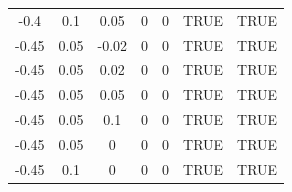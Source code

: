 \documentclass[
10pt, %
a4paper, %
oneside, %
headinclude,footinclude, %
BCOR5mm, %
]{scrartcl}
\begin{document}
\begin{table}[H]
\begin{tabular}{|c|c|c|c|c|c|c|}
		-0.4  & 0.1   & 0.05  & 0          & 0         & TRUE       & TRUE      \\
		-0.45 & 0.05  & -0.02 & 0          & 0         & TRUE       & TRUE      \\
		-0.45 & 0.05  & 0.02  & 0          & 0         & TRUE       & TRUE      \\
		-0.45 & 0.05  & 0.05  & 0          & 0         & TRUE       & TRUE      \\
		-0.45 & 0.05  & 0.1   & 0          & 0         & TRUE       & TRUE      \\
		-0.45 & 0.05  & 0     & 0          & 0         & TRUE       & TRUE      \\
		-0.45 & 0.1   & 0     & 0          & 0         & TRUE       & TRUE      \\
		\hline 
	\end{tabular}
\end{table}
\end{document}

